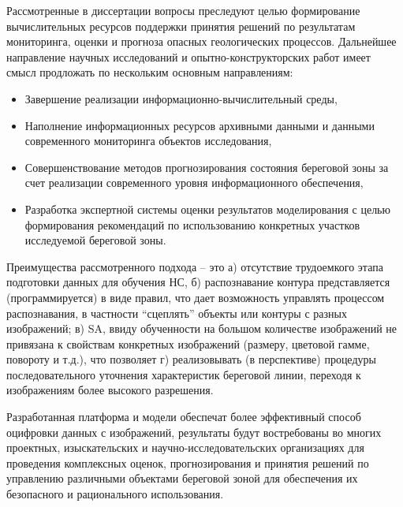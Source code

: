 \documentclass[732,14pt,final]{studrep}
\begin{document}
Рассмотренные в диссертации вопросы преследуют целью формирование вычислительных ресурсов поддержки принятия решений по результатам мониторинга, оценки и прогноза опасных геологических процессов. Дальнейшее направление научных исследований и опытно-конструкторских работ имеет смысл продложать по нескольким основным направлениям:
\begin{itemize}
  \item Завершение реализации информационно-вычислительный среды,
  \item Наполнение информационных ресурсов архивными данными и данными современного мониторинга объектов исследования,
  \item Совершенствование методов прогнозирования состояния береговой зоны за счет реализации современного уровня информационного обеспечения,
  \item Разработка экспертной системы оценки результатов моделирования с целью формирования рекомендаций по использованию конкретных участков исследуемой береговой зоны.
\end{itemize}

Преимущества рассмотренного подхода -- это а) отсутствие трудоемкого этапа подготовки данных для обучения НС, б) распознавание контура представляется (программируется) в виде правил, что дает возможность управлять процессом распознавания, в частности “сцеплять” объекты или контуры с разных изображений; в) SA, ввиду обученности на большом количестве изображений не привязана к свойствам конкретных изображений (размеру, цветовой гамме, повороту и т.д.), что позволяет г) реализовывать (в перспективе) процедуры последовательного уточнения характеристик береговой линии, переходя к изображениям более высокого разрешения.

Разработанная платформа и модели обеспечат более эффективный способ оцифровки данных с изображений, результаты будут востребованы во многих проектных, изыскательских и научно-исследовательских организациях для проведения комплексных оценок, прогнозирования и принятия решений по управлению различными объектами береговой зоной для обеспечения их безопасного и рационального использования.
\end{document}
